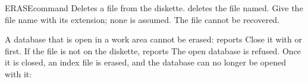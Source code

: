 \begin{XbaseEntry}{ERASE}{command}
Deletes a file from the diskette.
\Syntax
{}
\Usage
{} deletes the file named.  Give the file name with its extension;
none is assumed.  The file cannot be recovered.

A database that is open in a work area cannot be erased:
 reports   Close it with 
or  first.  If the file is not on the diskette, 
reports 
\Examples
The open database is refused.  Once it is closed, an index file is erased,
and the database can no longer be opened with it:
\end{XbaseEntry}

